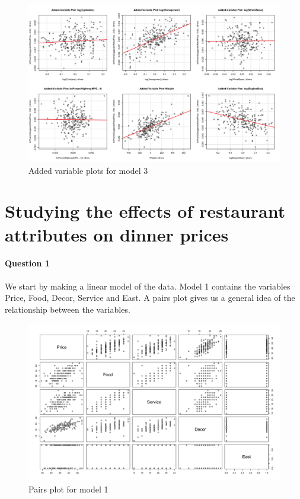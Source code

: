 \documentclass{article}
\begin{document}
\begin{figure}[h!]				
	\centering
	\includegraphics[width=12cm]{Part1_avplots_model3}
	\caption{Added variable plots for model 3}
\end{figure}



\section{Studying the effects of restaurant attributes on dinner prices}

\paragraph{Question 1}
We start by making a linear model of the data. Model 1 contains the variables Price, Food, Decor, Service and East. A pairs plot gives us a general idea of the relationship between the variables.

\begin{figure}[h!]				
	\centering
	\includegraphics[width=12cm]{Part2_Pairs}
	\caption{Pairs plot for model 1}
\end{figure}
\end{document}

